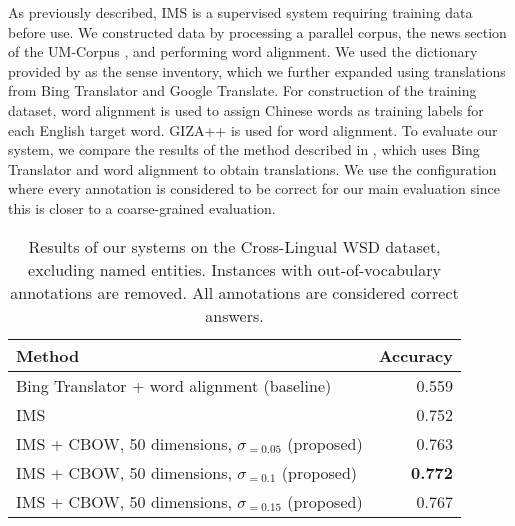 As previously described, IMS is a supervised system requiring training data before use. We constructed data by processing a parallel corpus, the news section of the UM-Corpus \cite{tian2014corpus}, and performing word alignment. We used the dictionary provided by \cite{tao2014} as the sense inventory, which we further expanded using translations from Bing Translator and Google Translate. For construction of the training dataset, word alignment is used to assign Chinese words as training labels for each English target word. GIZA++ \cite {och03} is used for word alignment. To evaluate our system, we compare the results of the method described in \cite{tao2014}, which uses Bing Translator and word alignment to obtain translations. We use the configuration where every annotation is considered to be correct for our main evaluation since this is closer to a coarse-grained evaluation. 

\begin{table}[ht]
	\caption{Results of our systems on the Cross-Lingual WSD dataset, excluding named entities. Instances with out-of-vocabulary annotations are removed. All annotations are considered correct answers.}
	\label{table:CLWSD-test-results}
	\begin{center}

			\begin{tabular}{| p{9cm}| r| }
				\hline
				\textbf{Method} & \textbf{Accuracy} \\
				\hline
				Bing Translator + 
                word alignment (baseline) & 0.559  \\
				\hline
				IMS & 0.752  \\
				\hline
                IMS + CBOW, 50 dimensions, $\sigma _{=0.05}$ (proposed) &  0.763  \\
				\hline
				IMS + CBOW, 50 dimensions, $\sigma _{=0.1}$ (proposed) & {\bf 0.772}  \\                                
                \hline
                IMS + CBOW, 50 dimensions, $\sigma _{=0.15}$ (proposed) & 0.767  \\
                \hline


			\end{tabular}

	\end{center}
\end{table}



